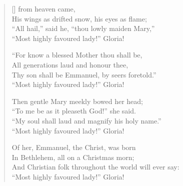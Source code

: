 \newHymn
{}

\begin{verse}[\versewidth]
 from heaven came,\\
His wings as drifted snow, his eyes as flame;\\
``All hail,'' said he, ``thou lowly maiden Mary,''\\
``Most highly favoured lady!'' Gloria!

``For know a blessed Mother thou shall be,\\
All generations laud and honour thee,\\
Thy son shall be Emmanuel, by seers foretold.''\\
``Most highly favoured lady!'' Gloria!

Then gentle Mary meekly bowed her head;\\
``To me be as it pleaseth God!'' she said.\\
``My soul shall laud and magnify his holy name.''\\
``Most highly favoured lady!'' Gloria!

Of her, Emmanuel, the Christ, was born\\
In Bethlehem, all on a Christmas morn;\\
And Christian folk throughout the world will ever say:\\
``Most highly favoured lady!'' Gloria!

\end{verse}



